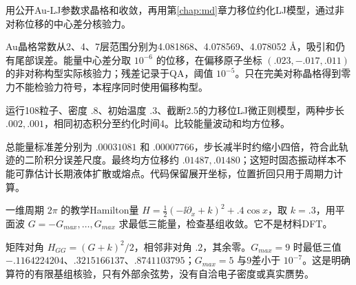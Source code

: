 \begin{exercise}
用公开Au-LJ参数求晶格和收敛，再用第\ref{chap:md}章力移位约化LJ模型，通过非对称位移的中心差分核验力。
\end{exercise}
\begin{solution}
Au晶格常数从2、4、7层范围分别为4.081868、4.078569、4.078052 Å，吸引和仍有尾部误差。能量中心差分取 $10^{-6}$ 的位移，在偏移原子坐标 $(.023,-.017,.011)$ 的非对称构型实际核验力；残差记录于QA，阈值 $10^{-5}$。只在完美对称晶格得到零力不能检验力符号，本程序同时使用偏移构型。
\end{solution}
\begin{exercise}
运行108粒子、密度 $.8$、初始温度 $.3$、截断2.5的力移位LJ微正则模型，两种步长 $.002,.001$，相同初态积分至约化时间4。比较能量波动和均方位移。
\end{exercise}
\begin{solution}
总能量标准差分别为 $.00031081$ 和 $.00007766$，步长减半时约缩小四倍，符合此轨迹的二阶积分误差尺度。最终均方位移约 $.01487,.01480$；这短时固态振动样本不能可靠估计长期液体扩散或熔点。代码保留展开坐标，位置折回只用于周期力计算。
\begin{center}\end{center}

\end{solution}
\begin{exercise}
一维周期 $2\pi$ 的教学Hamilton量 $H=\tfrac12(-\ii\partial_x+k)^2+.4\cos x$，取 $k=.3$，用平面波 $G=-G_{max},\ldots,G_{max}$ 求最低三能量，检查基组收敛。它不是材料DFT。
\end{exercise}
\begin{solution}
矩阵对角 $H_{GG}=(G+k)^2/2$，相邻非对角 $.2$，其余零。$G_{max}=9$ 时最低三值 $-.1164224204$、$.3215166137$、$.8741103795$；$G_{max}=5$ 与9差小于 $10^{-7}$。这是明确算符的有限基组核验，只有外部余弦势，没有自洽电子密度或真实赝势。
\begin{center}\end{center}

\end{solution}
